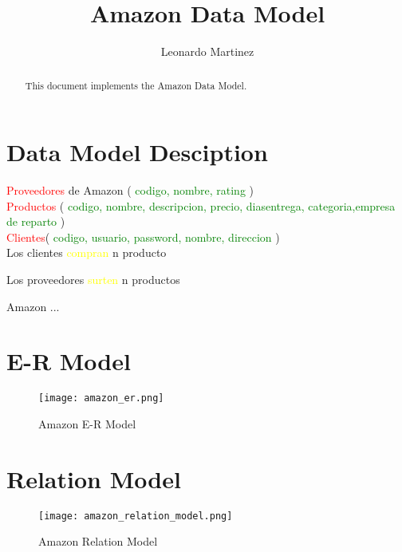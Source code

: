 \documentclass[10pt]{article}         %
\title{Amazon Data Model}
\author{Leonardo Martinez}
\begin{document}
\maketitle

\begin{abstract}
This document implements the Amazon Data Model.
\end{abstract}

\section{Data Model Desciption}


\textcolor{red}{Proveedores} de Amazon ( \textcolor{green}{codigo, nombre, rating} )\\

\textcolor{red}{Productos} ( \textcolor{green}{codigo, nombre, descripcion, precio, diasentrega, categoria,empresa de reparto} )
\\
\textcolor{red}{Clientes}( \textcolor{green}{ codigo, usuario, password, nombre, direccion} )\\

Los clientes \textcolor{yellow}{compran} n producto

Los proveedores \textcolor{yellow}{surten} n productos


Amazon ...
\section{E-R Model}
\begin{figure}[h]
     \texttt{[image: amazon\_er.png]}
     \caption{Amazon E-R Model}
\end{figure}

\section{Relation Model}
\begin{figure}[h]
     \texttt{[image: amazon\_relation\_model.png]}
     \caption{Amazon Relation Model}
\end{figure}
\end{document}
